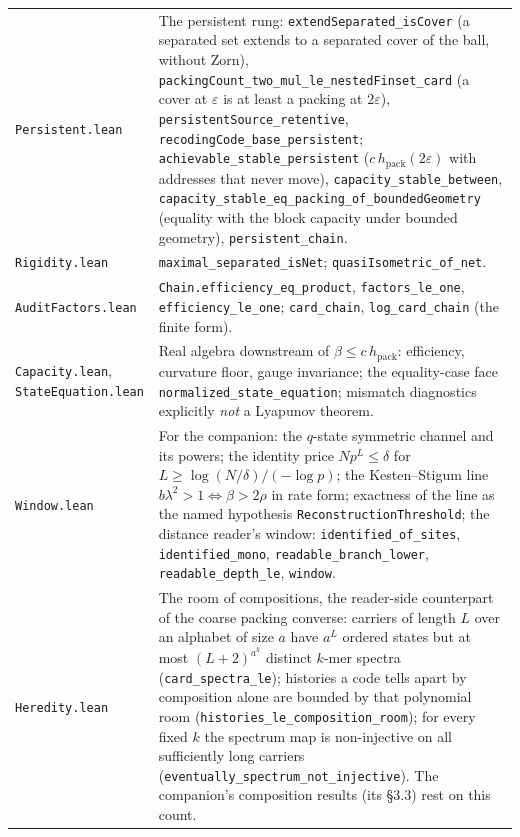 \documentclass[11pt,a4paper]{article}
\theoremstyle{plain}
\theoremstyle{definition}
\theoremstyle{remark}
\newcommand{\hpack}{h_{\mathrm{pack}}}
\begin{document}
{\begin{longtable}{@{}>{\raggedright\arraybackslash}p{4.3cm}>{\raggedright\arraybackslash}p{10.6cm}@{}}
\texttt{Persistent.lean} & The persistent rung: \texttt{extendSeparated\_\allowbreak{}isCover} (a separated set extends to a separated cover of the ball, without Zorn), \texttt{packingCount\_\allowbreak{}two\_\allowbreak{}mul\_\allowbreak{}le\_\allowbreak{}nestedFinset\_\allowbreak{}card} (a cover at $\varepsilon$ is at least a packing at $2\varepsilon$), \texttt{persistentSource\_\allowbreak{}retentive}, \texttt{recodingCode\_\allowbreak{}base\_\allowbreak{}persistent}; \texttt{achievable\_\allowbreak{}stable\_\allowbreak{}persistent} ($c\,\hpack(2\varepsilon)$ with addresses that never move), \texttt{capacity\_\allowbreak{}stable\_\allowbreak{}between}, \texttt{capacity\_\allowbreak{}stable\_\allowbreak{}eq\_\allowbreak{}packing\_\allowbreak{}of\_\allowbreak{}boundedGeometry} (equality with the block capacity under bounded geometry), \texttt{persistent\_\allowbreak{}chain}. \\
\texttt{Rigidity.lean} & \texttt{maximal\_\allowbreak{}separated\_\allowbreak{}isNet}; \texttt{quasiIsometric\_\allowbreak{}of\_\allowbreak{}net}. \\
\texttt{AuditFactors.lean} & \texttt{Chain.efficiency\_\allowbreak{}eq\_\allowbreak{}product}, \texttt{factors\_\allowbreak{}le\_\allowbreak{}one}, \texttt{efficiency\_\allowbreak{}le\_\allowbreak{}one}; \texttt{card\_\allowbreak{}chain}, \texttt{log\_\allowbreak{}card\_\allowbreak{}chain} (the finite form). \\
\texttt{Capacity.lean}, \texttt{StateEquation.lean} & Real algebra downstream of $\beta\le c\,\hpack$: efficiency, curvature floor, gauge invariance; the equality-case face \texttt{normalized\_\allowbreak{}state\_\allowbreak{}equation}; mismatch diagnostics explicitly \emph{not} a Lyapunov theorem. \\
\texttt{Window.lean} & For the companion: the $q$-state symmetric channel and its powers; the identity price $Np^L\le\delta$ for $L\ge\log(N/\delta)/(-\log p)$; the Kesten--Stigum line $b\lambda^2>1\iff\beta>2\rho$ in rate form; exactness of the line as the named hypothesis \texttt{ReconstructionThreshold}; the distance reader's window: \texttt{identified\_\allowbreak{}of\_\allowbreak{}sites}, \texttt{identified\_\allowbreak{}mono}, \texttt{readable\_\allowbreak{}branch\_\allowbreak{}lower}, \texttt{readable\_\allowbreak{}depth\_\allowbreak{}le}, \texttt{window}. \\
\texttt{Heredity.lean} & The room of compositions, the reader-side counterpart of the coarse packing converse: carriers of length $L$ over an alphabet of size $a$ have $a^L$ ordered states but at most $(L+2)^{a^k}$ distinct $k$-mer spectra (\texttt{card\_\allowbreak{}spectra\_\allowbreak{}le}); histories a code tells apart by composition alone are bounded by that polynomial room (\texttt{histories\_\allowbreak{}le\_\allowbreak{}composition\_\allowbreak{}room}); for every fixed $k$ the spectrum map is non-injective on all sufficiently long carriers (\texttt{eventually\_\allowbreak{}spectrum\_\allowbreak{}not\_\allowbreak{}injective}). The companion's composition results (its \S3.3) rest on this count. \\
\bottomrule
\end{longtable}}
\end{document}
